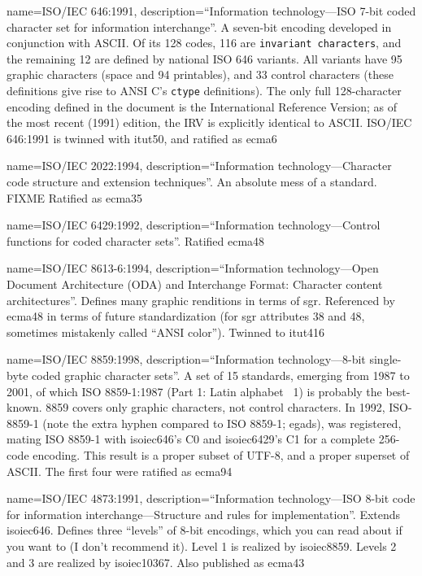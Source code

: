 {
  name={ISO/IEC 646:1991},
  description={``Information technology---ISO 7-bit coded character set for
    information interchange''. A seven-bit encoding developed in conjunction
    with ASCII. Of its 128 codes, 116 are \texttt{invariant characters}, and
    the remaining 12 are defined by national ISO 646 variants. All variants
    have 95 graphic characters (space and 94 printables), and 33 control
    characters (these definitions give rise to ANSI C's \texttt{ctype}
    definitions). The only full 128-character encoding defined in the document
    is the International Reference Version; as of the most recent (1991)
    edition, the IRV is explicitly identical to ASCII. ISO/IEC 646:1991 is
    twinned with \Gls{itut50}, and ratified as \Gls{ecma6}}
}

{
  name={ISO/IEC 2022:1994},
  description={``Information technology---Character code structure and extension techniques''.
   An absolute mess of a standard. FIXME
   Ratified as \Gls{ecma35}}
}

{
  name={ISO/IEC 6429:1992},
  description={``Information technology---Control functions for coded character sets''.
   Ratified \Gls{ecma48}}
}

{
  name={ISO/IEC 8613-6:1994},
  description={``Information technology---Open Document Architecture (ODA) and Interchange Format: Character content architectures''.
    Defines many graphic renditions in terms of \Gls{sgr}. Referenced by \Gls{ecma48} in terms
    of future standardization (for \Gls{sgr} attributes 38 and 48, sometimes
    mistakenly called ``ANSI color''). Twinned to \Gls{itut416}}
}

{
  name={ISO/IEC 8859:1998},
  description={``Information technology---8-bit single-byte coded graphic character sets''.
    A set of 15 standards, emerging from 1987 to 2001, of which ISO 8859-1:1987 (Part 1: Latin alphabet \textnumero\ 1) is
    probably the best-known. 8859 covers only graphic characters, not control
    characters. In 1992, ISO-8859-1 (note the extra hyphen compared to ISO 8859-1; egads),
    was registered, mating ISO 8859-1 with \Gls{isoiec646}'s \Gls{C0} and
    \Gls{isoiec6429}'s C1 for a complete 256-code encoding. This result is a
    proper subset of UTF-8, and a proper superset of ASCII. The first four were
    ratified as \Gls{ecma94}}
}

{
  name={ISO/IEC 4873:1991},
  description={``Information technology---ISO 8-bit code for information interchange---Structure and rules for implementation''.
    Extends \Gls{isoiec646}. Defines three ``levels'' of 8-bit encodings, which
    you can read about if you want to (I don't recommend it). Level 1 is
    realized by \Gls{isoiec8859}. Levels 2 and 3 are realized by \Gls{isoiec10367}.
    Also published as \Gls{ecma43}}
}

